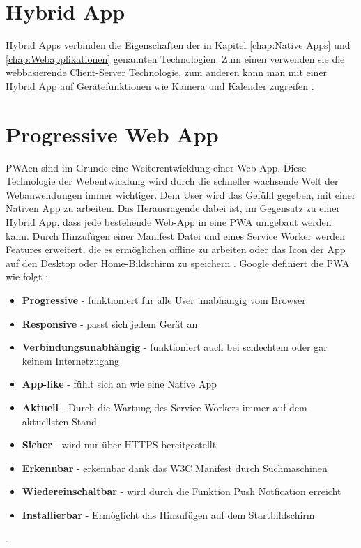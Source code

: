 \section{Hybrid App}
Hybrid Apps verbinden die Eigenschaften der in Kapitel \ref{chap:Native Apps} und \ref{chap:Webapplikationen} genannten Technologien. Zum einen verwenden sie die webbasierende Client-Server Technologie, zum anderen kann man mit einer Hybrid App auf Gerätefunktionen wie Kamera und Kalender zugreifen \cite{HybridApps}. 

\section{Progressive Web App}\label{chap:ProgressiveWebapplikationen}
\acl{PWA}en sind im Grunde eine Weiterentwicklung einer \acs{Web-App}. Diese Technologie der Webentwicklung wird durch die schneller wachsende Welt der Webanwendungen immer wichtiger. 
Dem User wird das Gefühl gegeben, mit einer Nativen App zu arbeiten. Das Herausragende dabei ist, im Gegensatz zu einer Hybrid App, dass jede bestehende \acs{Web-App} in eine \acs{PWA} umgebaut werden kann.
Durch Hinzufügen einer Manifest Datei und eines Service Worker werden Features erweitert, die es ermöglichen offline zu arbeiten oder das Icon der App auf den Desktop oder Home-Bildschirm zu speichern \cite{PWA}.
Google definiert die \acs{PWA} wie folgt \cite{PWAAdjectives}:
\begin{itemize}
    \item  \textbf{Progressive} - funktioniert für alle User unabhängig vom Browser
	\item  \textbf{Responsive} - passt sich jedem Gerät an	
	\item  \textbf{Verbindungsunabhängig} - funktioniert auch bei schlechtem oder gar keinem Internetzugang
	\item  \textbf{App-like} - fühlt sich an wie eine Native App
	\item  \textbf{Aktuell} - Durch die Wartung des Service Workers immer auf dem aktuellsten Stand
	\item  \textbf{Sicher} - wird nur über HTTPS bereitgestellt
	\item  \textbf{Erkennbar} - erkennbar dank das W3C Manifest durch Suchmaschinen
	\item  \textbf{Wiedereinschaltbar} - wird durch die Funktion Push Notfication erreicht
	\item  \textbf{Installierbar} - Ermöglicht das Hinzufügen auf dem Startbildschirm
\end{itemize}. 


